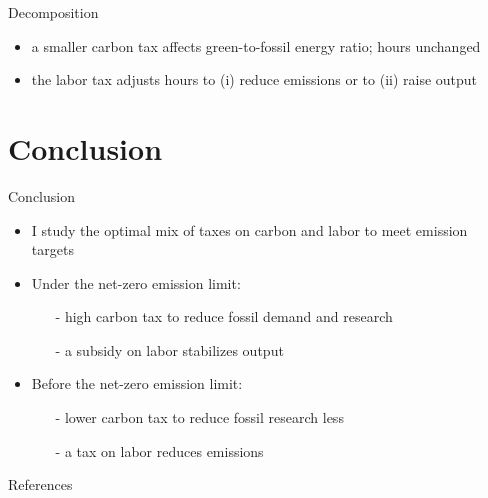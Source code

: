 \documentclass[11pt,aspectratio=169]{beamer}
\begin{document}
\begin{frame}{Decomposition}
\begin{figure}[h!!]
\begin{subfigure}{0.4\textwidth}
	\end{subfigure}
\end{figure}
\vspace{3mm}
\begin{block}{}
	\begin{itemize}
		\item a smaller carbon tax  affects green-to-fossil energy ratio; hours unchanged
		\item the labor tax adjusts hours to (i) reduce emissions or to (ii) raise output
	\end{itemize}
\end{block}	
\end{frame}

\hypertarget{conc}{}
\section{Conclusion}
\begin{frame}{Conclusion}
\begin{itemize}[<+-| alert@+>]
	\item I study the optimal mix of taxes on carbon and labor to meet emission targets
	\vspace{3mm}
	\item Under the net-zero emission limit: 
	\begin{itemize}
		\item[-] high carbon tax to reduce fossil demand and research
		\item[-]  a subsidy on labor stabilizes output
	\end{itemize}
	\vspace{3mm}
	\item Before the net-zero emission limit: 
	\begin{itemize}
		\item[-]  lower carbon tax to reduce fossil research less
		\item[-] a tax on labor reduces emissions
	\end{itemize}
\end{itemize}
\end{frame}
\begin{frame}[shrink]{References}



\end{frame}



\appendix
\end{document}
